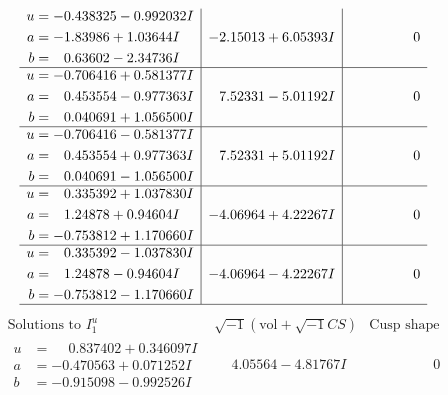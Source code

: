 \documentclass[1p]{elsarticle_modified}
\theoremstyle{definition}
\newcommand{\I}{\sqrt{-1}}
\begin{document}
$$\begin{array}{c|c|c}
\begin{aligned}
u &= -0.438325 - 0.992032 I \\
a &= -1.83986 + 1.03644 I \\
b &= \phantom{-}0.63602 - 2.34736 I\end{aligned}
 & -2.15013 + 6.05393 I & \phantom{-0.000000 } 0 \\ \hline\begin{aligned}
u &= -0.706416 + 0.581377 I \\
a &= \phantom{-}0.453554 - 0.977363 I \\
b &= \phantom{-}0.040691 + 1.056500 I\end{aligned}
 & \phantom{-}7.52331 - 5.01192 I & \phantom{-0.000000 } 0 \\ \hline\begin{aligned}
u &= -0.706416 - 0.581377 I \\
a &= \phantom{-}0.453554 + 0.977363 I \\
b &= \phantom{-}0.040691 - 1.056500 I\end{aligned}
 & \phantom{-}7.52331 + 5.01192 I & \phantom{-0.000000 } 0 \\ \hline\begin{aligned}
u &= \phantom{-}0.335392 + 1.037830 I \\
a &= \phantom{-}1.24878 + 0.94604 I \\
b &= -0.753812 + 1.170660 I\end{aligned}
 & -4.06964 + 4.22267 I & \phantom{-0.000000 } 0 \\ \hline\begin{aligned}
u &= \phantom{-}0.335392 - 1.037830 I \\
a &= \phantom{-}1.24878 - 0.94604 I \\
b &= -0.753812 - 1.170660 I\end{aligned}
 & -4.06964 - 4.22267 I & \phantom{-0.000000 } 0\\
 \hline 
 \end{array}$$\newpage$$\begin{array}{c|c|c}  
\text{Solutions to }I^u_{1}& \I (\text{vol} + \sqrt{-1}CS) & \text{Cusp shape}\\
 \hline 
\begin{aligned}
u &= \phantom{-}0.837402 + 0.346097 I \\
a &= -0.470563 + 0.071252 I \\
b &= -0.915098 - 0.992526 I\end{aligned}
 & \phantom{-}4.05564 - 4.81767 I & \phantom{-0.000000 } 0 \\ \hline\begin{aligned}

\end{aligned}
\end{array}$$
\end{document}
